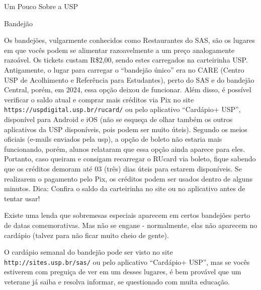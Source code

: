 \begin{secao}{Um Pouco Sobre a USP}

\begin{subsecao}{Bandejão}


Os bandejões, vulgarmente conhecidos como Restaurantes do SAS, são os lugares
em que vocês podem se alimentar razoavelmente a um preço analogamente razoável.
Os tickets custam R\$2,00, sendo estes carregados na carteirinha USP. Antigamente, o
lugar para carregar o ``bandejão único'' era no CARE (Centro USP de Acolhimento e 
Referência para Estudantes), perto do SAS e do bandejão Central, porém, em 2024, essa
opção deixou de funcionar. Além disso, é possível verificar o saldo atual e comprar 
mais créditos via Pix no site {\tt https://uspdigital.usp.br/rucard/} ou pelo
aplicativo ``Cardápio+ USP'', disponível para Android e iOS (não se esqueça de olhar 
também os outros aplicativos da USP disponíveis, pois podem ser muito úteis).
Segundo os meios oficiais (e-mails enviados pela usp), a opção de boleto não 
estaria mais funcionando, porém, alunos relataram que essa opção ainda aparece 
para eles. Portanto, caso queiram e consigam recarregar o RUcard via boleto, fique 
sabendo que os créditos demoram até 03 (três) dias úteis para estarem disponíveis.
Se realizarem o pagamento pelo Pix, os créditos podem ser usados dentro de alguns
minutos.
Dica: Confira o saldo da carteirinha no site ou no aplicativo antes de tentar usar!

Existe uma lenda que sobremesas especiais aparecem em certos bandejões perto de
datas comemorativas. Mas não se engane - normalmente, elas não aparecem no
cardápio (talvez para não ficar muito cheio de gente).


O cardápio semanal do bandejão pode ser visto no site {\tt
http://sites.usp.br/sas/} ou pelo aplicativo ``Cardápio+ USP'', mas se vocês
estiverem com preguiça de ver em um desses lugares, é bem provável que um veterane 
já saiba e resolva informar, se questionado com muita educação.


\end{subsecao}
\end{secao}
